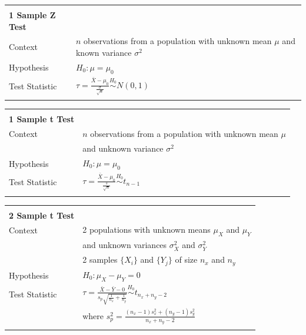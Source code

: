 \documentclass[bigtut]{tutorial}\usepackage[]{graphicx}\usepackage[]{color}
\begin{document}

\begin{tutorial}

\begin{center}
\begin{tabular}{| ll |} \hline
& \\
{\bf 1 Sample Z Test} & \\
Context & $n$ observations from  a population with unknown mean $\mu$ and known variance $\sigma^2$ \\
Hypothesis &   $H_{0}: \mu = \mu_{0}$   \\
Test Statistic & $\tau =   \frac{  \bar{X} - \mu_{0}  } {  \frac{  \sigma }{ \sqrt{n}  }}      \overset{H_0}{\sim} N(0, 1)$      \\ 
& \\  \hline
\end{tabular}
\end{center}


\begin{center}
\begin{tabular}{| ll |} \hline
& \\
{\bf 1 Sample t Test} & \\
Context & $n$ observations from  a population with unknown mean $\mu$ \\
& and unknown variance $\sigma^2$ \\
Hypothesis &   $H_{0}: \mu = \mu_{0}$   \\
Test Statistic & $\tau =   \frac{  \bar{X} - \mu_{0}  } {  \frac{  s }{ \sqrt{n}  }}      \overset{H_0}{\sim} t_{n-1}$      \\ 
& \\  \hline
\end{tabular}
\end{center}

\begin{center}
\begin{tabular}{| ll |} \hline
& \\
{\bf 2 Sample t Test} & \\
Context & 2 populations with unknown means $\mu_{X}$ and  $\mu_{Y}$  \\
&  and unknown variances $\sigma_{X}^2$ and $\sigma_{Y}^2$ \\
& 2 samples $\{ X_i \} $ and $\{ Y_j \} $ of size $n_x$ and $n_y$ \\
Hypothesis &   $H_{0}: \mu_X - \mu_Y = 0$   \\
Test Statistic & $\tau =   \frac{  \bar{X} - \bar{Y} - 0  } {  s_p  \sqrt{ \frac{1}{n_x} +  \frac{1}{n_y}  }}      \overset{H_0}{\sim} t_{n_x + n_y-2}$      \\ 
&  \hspace{2cm}    where \;   $s_p^2 =  \frac{   (n_x-1) s_x^2 + (n_y-1) s_y^2 }{ n_x + n_y -2 }$ \;\; \\
& \\  \hline
\end{tabular}
\end{center}


\end{tutorial}
\end{document}
